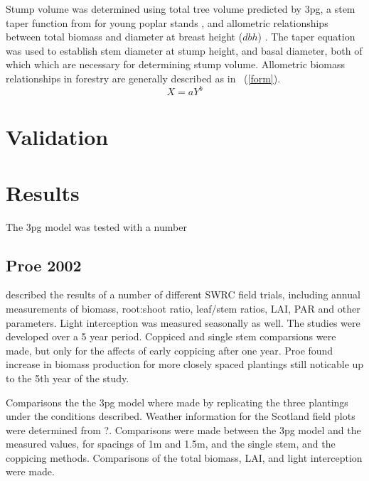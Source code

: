 \documentclass[10pt]{article}
\begin{document}
Stump volume was determined using total tree volume predicted by \ac{3pg},
a stem taper function from for young poplar stands
\cite{Benbrahim2003} , and allometric relationships between total
biomass and diameter at breast height ($dbh$) \cite{Brahim2000}. The
taper equation was used to establish stem diameter at stump height,
and basal diameter, both of which which are necessary for determining
stump volume. Allometric biomass relationships in forestry are
generally described as in ~(\ref{form}).
\begin{equation}
  \label{eq:form}
  X=aY^b
\end{equation}




\section*{Validation}

\section*{Results}

The \ac{3pg} model was tested with a number

\subsection*{Proe 2002}

\cite{proe02} described the results of a number of different \ac{SWRC}
field trials, including annual measurements of biomass, root:shoot
ratio, leaf/stem ratios, LAI, PAR and other parameters.  Light
interception was measured seasonally as well.  The studies were
developed over a 5 year period. Coppiced and single stem comparsions
were made, but only for the affects of early coppicing after one year.
Proe found increase in biomass production for more closely spaced
plantings still noticable up to the 5th year of the study.

Comparisons the the \ac{3pg} model where made by replicating the three
plantings under the conditions described.  Weather information for the
Scotland field plots were determined from ?.  Comparisons were made
between the \ac{3pg} model and the measured values, for spacings of 1m and
1.5m, and the single stem, and the coppicing methods.  Comparisons of
the total biomass, LAI, and light interception were made.
\end{document}
